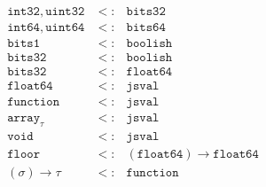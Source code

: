 \documentclass{article}
\newcommand{\funty}[2]{({#1}) \rightarrow {#2}}
\newcommand{\seq}[1]{\overline{{#1}}}
\newcommand\defeq{\stackrel{\mbox{\tiny def}}{=}}
\newcommand{\boolean}{\mathtt{bits1}}
\newcommand{\uintone}{\mathtt{uint8}}
\newcommand{\uinttwo}{\mathtt{uint16}}
\newcommand{\uintfour}{\mathtt{uint32}}
\newcommand{\uinteight}{\mathtt{uint64}}
\newcommand{\intone}{\mathtt{int8}}
\newcommand{\inttwo}{\mathtt{int16}}
\newcommand{\intfour}{\mathtt{int32}}
\newcommand{\inteight}{\mathtt{int64}}
\newcommand{\float}{\mathtt{float32}}
\newcommand{\double}{\mathtt{float64}}
\newcommand{\arr}[1]{\mathtt{array}_{#1}}
\newcommand{\any}{\mathtt{jsval}}
\newcommand{\undef}{\mathtt{undefined}}
\newcommand{\void}{\mathtt{void}}
\newcommand{\nul}{\mathtt{null}}
\newcommand{\num}{\mathtt{number}}
\newcommand{\obj}{\mathtt{object}}
\newcommand{\word}{\mathtt{bits32}}
\newcommand{\dword}{\mathtt{bits64}}
\newcommand{\function}{\mathtt{function}}
\newcommand{\union}[2]{{#1}\mathrel{|}{#2}}
\newcommand{\boolish}{\mathtt{boolish}}
\newcommand{\floor}{\mathtt{floor}}
\begin{document}
\[
\begin{array}{rcl}
\intfour, \uintfour   & <: & \word \\
\inteight, \uinteight & <: & \dword \\
\boolean              & <: & \boolish \\
\word                 & <: & \boolish \\
\word                 & <: & \double \\
\double               & <: & \any \\
\function             & <: & \any \\
\arr{\tau}            & <: & \any \\
\void                 & <: & \any \\
\floor                & <: & \funty{\double}{\double} \\
\funty{\sigma}{\tau}  & <: & \function \\
\end{array}
\]


\end{document}
